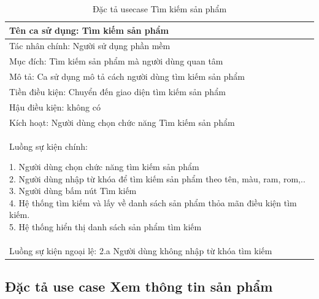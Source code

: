 \documentclass[../DoAn.tex]{subfiles}
\begin{document}
\begin{table}[H]
\centering{}
    \begin{tabular}{|l|}
    \hline
    Tên ca sử dụng: Tìm kiếm sản phẩm \\
    \hline
    Tác nhân chính: Người sử dụng phần mềm\\
    \hline
    Mục đích: Tìm kiếm sản phẩm mà người dùng quan tâm\\
    \hline
    Mô tả: Ca sử dụng mô tả cách người dùng tìm kiếm sản phẩm\\
    \hline
    Tiền điều kiện: Chuyển đến giao diện tìm kiếm sản phẩm\\
    \hline
    Hậu điều kiện: không có\\
    \hline
    Kích hoạt: Người dùng chọn chức năng Tìm kiếm sản phẩm\\
    \hline
    \makecell{Luồng sự kiện chính: \\
    
    1. Người dùng chọn chức năng tìm kiếm sản phẩm
    \\
    2. Người dùng nhập từ khóa để tìm kiếm sản phẩm theo tên, màu, ram, rom,..
    \\
    3. Người dùng bấm nút Tìm kiếm
    \\
    4. Hệ thống tìm kiếm và lấy về danh sách sản phẩm thỏa mãn điều kiện tìm kiếm.
    \\
    5. Hệ thống hiển thị danh sách sản phẩm tìm kiếm}
    \\
    \hline
    Luồng sự kiện ngoại lệ: 2.a Người dùng không nhập từ khóa tìm kiếm 
    \\
    \hline
    \end{tabular}
    \caption{Đặc tả usecase Tìm kiếm sản phẩm}
    \label{fig:my_label}
\end{table}

\hfill
\subsection{Đặc tả use case Xem thông tin sản phẩm}
\end{document}
